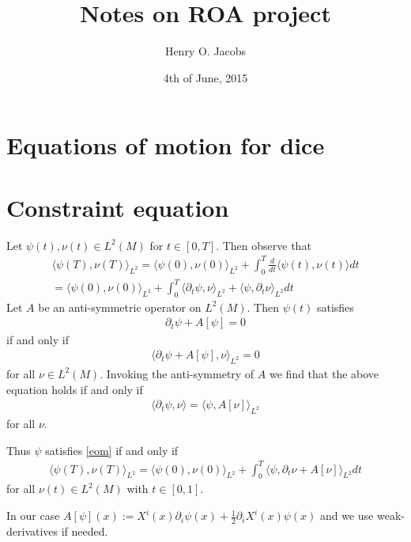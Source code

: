 \documentclass[12pt]{amsart}
\title{Notes on ROA project}
\author{Henry O. Jacobs}
\date{4th of June, 2015}
\begin{document}
\maketitle

\section{Equations of motion for dice}

\section{Constraint equation}

Let $\psi(t),\nu(t) \in L^2(M)$ for $t \in [0,T]$.
Then observe that
\begin{align*}
  \langle \psi(T) , \nu(T) \rangle_{L^2} = \langle \psi(0) , \nu(0) \rangle_{L^2} + \int_0^T \frac{d}{dt} \langle \psi(t) , \nu(t) \rangle dt \\
 = \langle \psi(0) , \nu(0) \rangle_{L^2}  + 
 \int_0^T \langle \partial_t \psi , \nu \rangle_{L^2} + \langle \psi , \partial_t \nu \rangle_{L^2} dt
\end{align*}
Let $A$ be an anti-symmetric operator on $L^2(M)$.
Then $\psi(t)$ satisfies
\begin{align}
  \partial_t \psi + A[\psi] = 0 \label{eom}
\end{align}
if and only if
\begin{align*}
  \langle \partial_t \psi + A[\psi] , \nu \rangle_{L^2} = 0
\end{align*}
for all $\nu \in L^2(M)$.
Invoking the anti-symmetry of $A$ we find that the above equation holds if and only if
\begin{align*}
  \langle \partial_t \psi , \nu \rangle =  \langle \psi , A[\nu] \rangle_{L^2} 
\end{align*}
for all $\nu$.

Thus $\psi$ satisfies \eqref{eom} if and only if
\begin{align*}
  \langle \psi(T) , \nu(T) \rangle_{L^2} = \langle \psi(0) , \nu(0) \rangle_{L^2} + \int_0^T \langle \psi , \partial_t \nu + A[\nu] \rangle_{L^2} dt
\end{align*}
for all $\nu(t) \in L^2(M)$ with $t \in [0,1]$.


In our case $A[\psi] (x) := X^i(x) \partial_i\psi(x) + \frac{1}{2} \partial_i X^i(x) \psi(x) $ and we use weak-derivatives if needed.
\end{document}
